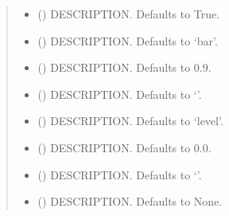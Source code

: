 \documentclass[letterpaper,10pt,english]{sphinxmanual}
\begin{document}
\begin{fulllineitems}
\begin{fulllineitems}
\begin{quote}
\begin{description}
\begin{itemize}
\item {} 
\sphinxAtStartPar
{} (\sphinxstyleliteralemphasis{\sphinxupquote{, }}) \textendash{} DESCRIPTION. Defaults to True.

\item {} 
\sphinxAtStartPar
{} (\sphinxstyleliteralemphasis{\sphinxupquote{, }}) \textendash{} DESCRIPTION. Defaults to ‘bar’.

\item {} 
\sphinxAtStartPar
{} (\sphinxstyleliteralemphasis{\sphinxupquote{, }}) \textendash{} DESCRIPTION. Defaults to 0.9.

\item {} 
\sphinxAtStartPar
{} (\sphinxstyleliteralemphasis{\sphinxupquote{, }}) \textendash{} DESCRIPTION. Defaults to ‘’.

\item {} 
\sphinxAtStartPar
{} (\sphinxstyleliteralemphasis{\sphinxupquote{, }}) \textendash{} DESCRIPTION. Defaults to ‘level’.

\item {} 
\sphinxAtStartPar
{} (\sphinxstyleliteralemphasis{\sphinxupquote{, }}) \textendash{} DESCRIPTION. Defaults to 0.0.

\item {} 
\sphinxAtStartPar
{} (\sphinxstyleliteralemphasis{\sphinxupquote{, }}) \textendash{} DESCRIPTION. Defaults to ‘’.

\item {} 
\sphinxAtStartPar
{} (\sphinxstyleliteralemphasis{\sphinxupquote{, }}) \textendash{} DESCRIPTION. Defaults to None.


\end{itemize}
\end{description}
\end{quote}
\end{fulllineitems}
\end{fulllineitems}
\end{document}
